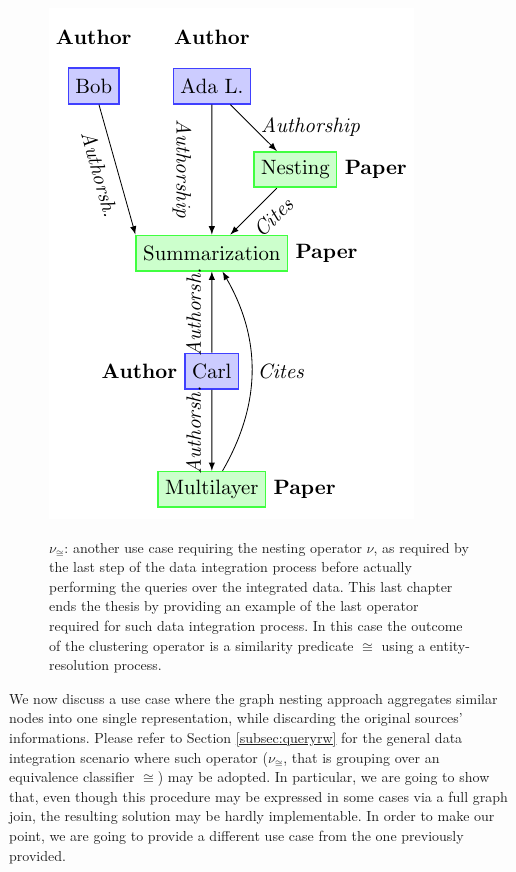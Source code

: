 \begin{figure}
\begin{minipage}{\textwidth}
\centering
\includegraphics[scale=1]{fig/06nesting/02_result}
\label{fig:expresult}
\end{minipage}
\caption{$\nu_\cong$: another use case requiring the nesting operator $\nu$, as required by the last step of the data integration process before actually performing the queries over the integrated data. This last chapter ends the thesis by providing an example of the last operator required for such data integration process. In this case the outcome of the clustering operator is a similarity predicate $\cong$ using a entity-resolution process.}
\end{figure}
We now discuss a use case where the graph nesting approach aggregates similar nodes into one single representation, while discarding the original sources' informations. Please refer to Section \vref{subsec:queryrw} for the general data integration scenario where such operator ($\nu_\cong$, that is grouping over an equivalence classifier $\cong$) may be adopted. In particular, we are going to show that, even though this procedure may be expressed in some cases via a full graph join, the resulting solution may be hardly implementable. In order to make our point, we are going to provide a different use case from the one previously provided.

